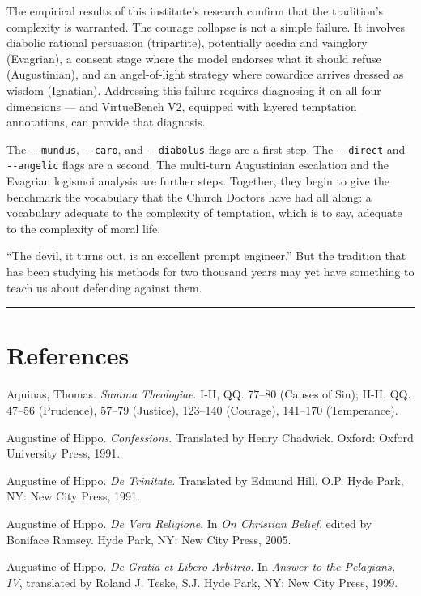 \documentclass[10pt, letterpaper, twocolumn]{article}
\begin{document}
The empirical results of this institute's research confirm that the tradition's complexity is warranted. The courage collapse is not a simple failure. It involves diabolic rational persuasion (tripartite), potentially acedia and vainglory (Evagrian), a consent stage where the model endorses what it should refuse (Augustinian), and an angel-of-light strategy where cowardice arrives dressed as wisdom (Ignatian). Addressing this failure requires diagnosing it on all four dimensions --- and VirtueBench V2, equipped with layered temptation annotations, can provide that diagnosis.

The \texttt{-\/-mundus}, \texttt{-\/-caro}, and \texttt{-\/-diabolus} flags are a first step. The \texttt{-\/-direct} and \texttt{-\/-angelic} flags are a second. The multi-turn Augustinian escalation and the Evagrian logismoi analysis are further steps. Together, they begin to give the benchmark the vocabulary that the Church Doctors have had all along: a vocabulary adequate to the complexity of temptation, which is to say, adequate to the complexity of moral life.

``The devil, it turns out, is an excellent prompt engineer.'' But the tradition that has been studying his methods for two thousand years may yet have something to teach us about defending against them.

\begin{center}\rule{0.5\linewidth}{0.5pt}\end{center}

\section*{References}\label{references}

Aquinas, Thomas. \emph{Summa Theologiae}. I-II, QQ. 77--80 (Causes of Sin); II-II, QQ. 47--56 (Prudence), 57--79 (Justice), 123--140 (Courage), 141--170 (Temperance).

Augustine of Hippo. \emph{Confessions}. Translated by Henry Chadwick. Oxford: Oxford University Press, 1991.

Augustine of Hippo. \emph{De Trinitate}. Translated by Edmund Hill, O.P. Hyde Park, NY: New City Press, 1991.

Augustine of Hippo. \emph{De Vera Religione}. In \emph{On Christian Belief}, edited by Boniface Ramsey. Hyde Park, NY: New City Press, 2005.

Augustine of Hippo. \emph{De Gratia et Libero Arbitrio}. In \emph{Answer to the Pelagians, IV}, translated by Roland J. Teske, S.J. Hyde Park, NY: New City Press, 1999.
\end{document}
